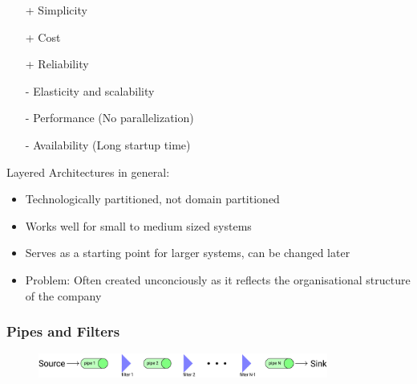 \documentclass[
../../Software_Engineering_Summary.tex,
]
{subfiles}
\begin{document}
\begin{defbox}
    \begin{minipage}
        [t]{0.5\textwidth}
        \centering
        \begin{itemize}
            \item[+] Simplicity
            \item[+] Cost
            \item[+] Reliability  
        \end{itemize}
    \end{minipage}
    \hfill
    \begin{minipage}
        [t]{0.5\textwidth}
        \centering
        \begin{itemize}
            \item[-] Elasticity and scalability
            \item[-] Performance (No parallelization)
            \item[-] Availability (Long startup time)
        \end{itemize}
    \end{minipage}  
\end{defbox}

Layered Architectures in general:
\begin{itemize}
    \item Technologically partitioned, not domain partitioned
    \item Works well for small to medium sized systems
    \item Serves as a starting point for larger systems, can be changed later
    \item Problem: Often created unconciously as it reflects the organisational structure of the company
\end{itemize}

\subsubsection{Pipes and Filters}
\begin{figure}
    [htp]
    \centering
    \includegraphics[width = 0.85\textwidth]{Pics/05/PipesAndFilters.png}
\end{figure}
\end{document}
